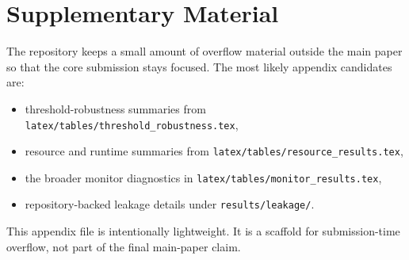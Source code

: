 \appendix
\section{Supplementary Material}

The repository keeps a small amount of overflow material outside the main paper
so that the core submission stays focused. The most likely appendix candidates
are:

\begin{itemize}
\item threshold-robustness summaries from \texttt{latex/tables/threshold\_robustness.tex},
\item resource and runtime summaries from \texttt{latex/tables/resource\_results.tex},
\item the broader monitor diagnostics in \texttt{latex/tables/monitor\_results.tex},
\item repository-backed leakage details under \texttt{results/leakage/}.
\end{itemize}

This appendix file is intentionally lightweight. It is a scaffold for
submission-time overflow, not part of the final main-paper claim.
